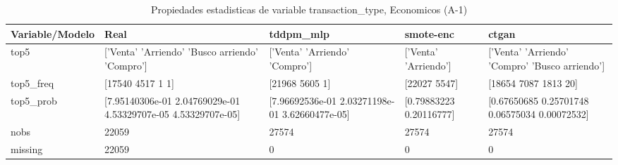 \begin{table}[H]
\centering
\fontsize{8}{14}\selectfont
\caption{Propiedades  estadisticas de variable transaction\_type, Economicos (A-1)}
\label{table-stats-economicos-a-1-transaction_type}
\begin{tabular}{|l|m{10em}|m{10em}|m{10em}|m{10em}|}
\hline
 \rowcolor[gray]{0.8}
Variable/Modelo & Real & tddpm\_mlp & smote-enc & ctgan \\
\hline top5 & ['Venta' 'Arriendo' 'Busco arriendo' 'Compro'] & ['Venta' 'Arriendo' 'Compro'] & ['Venta' 'Arriendo'] & ['Venta' 'Arriendo' 'Compro' 'Busco arriendo'] \\
\hline top5\_freq & [17540  4517     1     1] & [21968  5605     1] & [22027  5547] & [18654  7087  1813    20] \\
\hline top5\_prob & [7.95140306e-01 2.04769029e-01 4.53329707e-05 4.53329707e-05] & [7.96692536e-01 2.03271198e-01 3.62660477e-05] & [0.79883223 0.20116777] & [0.67650685 0.25701748 0.06575034 0.00072532] \\
\hline nobs & 22059 & 27574 & 27574 & 27574 \\
\hline missing & 22059 & 0 & 0 & 0 \\
\hline
\end{tabular}
\end{table}
